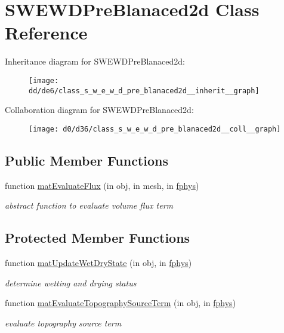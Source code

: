 \hypertarget{class_s_w_e_w_d_pre_blanaced2d}{}\section{S\+W\+E\+W\+D\+Pre\+Blanaced2d Class Reference}
\label{class_s_w_e_w_d_pre_blanaced2d}


Inheritance diagram for S\+W\+E\+W\+D\+Pre\+Blanaced2d\+:
\nopagebreak
\begin{figure}[H]
\begin{center}
\leavevmode
\texttt{[image: dd/de6/class\_s\_w\_e\_w\_d\_pre\_blanaced2d\_\_inherit\_\_graph]}
\end{center}
\end{figure}


Collaboration diagram for S\+W\+E\+W\+D\+Pre\+Blanaced2d\+:
\nopagebreak
\begin{figure}[H]
\begin{center}
\leavevmode
\texttt{[image: d0/d36/class\_s\_w\_e\_w\_d\_pre\_blanaced2d\_\_coll\_\_graph]}
\end{center}
\end{figure}
\subsection*{Public Member Functions}
\begin{DoxyCompactItemize}
\item 
function \hyperlink{class_s_w_e_w_d_pre_blanaced2d_a3aa951b2ef88db981c7e371cc3929fb6}{mat\+Evaluate\+Flux} (in obj, in mesh, in \hyperlink{class_ndg_phys_a6b25724fc9474d32018439009072f0a9}{fphys})
\begin{DoxyCompactList}\small\item\em abstract function to evaluate volume flux term \end{DoxyCompactList}\end{DoxyCompactItemize}
\subsection*{Protected Member Functions}
\begin{DoxyCompactItemize}
\item 
function \hyperlink{class_s_w_e_w_d_pre_blanaced2d_aee8de435e5f6f4b0a4ac48e42982facd}{mat\+Update\+Wet\+Dry\+State} (in obj, in \hyperlink{class_ndg_phys_a6b25724fc9474d32018439009072f0a9}{fphys})
\begin{DoxyCompactList}\small\item\em determine wetting and drying status \end{DoxyCompactList}\item 
function \hyperlink{class_s_w_e_w_d_pre_blanaced2d_a8b1954554505417779437dcf59972b41}{mat\+Evaluate\+Topography\+Source\+Term} (in obj, in \hyperlink{class_ndg_phys_a6b25724fc9474d32018439009072f0a9}{fphys})
\begin{DoxyCompactList}\small\item\em evaluate topography source term \end{DoxyCompactList}\end{DoxyCompactItemize}
